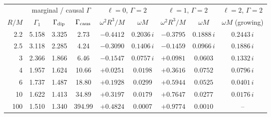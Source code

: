 \begin{tabular}{rccc|cc|cc|c}\toprule
 & \multicolumn{3}{c|}{marginal / causal $\Gamma$} & \multicolumn{2}{c|}{$\ell=0$, $\Gamma=2$} & \multicolumn{2}{c|}{$\ell=1$, $\Gamma=2$} & $\ell=2$, $\Gamma=2$\\
$R/M$ & $\Gamma_1$ & $\Gamma_{\rm dip}$ & $\Gamma_{\rm caus}$ & $\omega^2R^3/M$ & $\omega M$ & $\omega^2R^3/M$ & $\omega M$ & $\omega M$ (growing)\\\midrule
2.2 & 5.158 & 3.325 & 2.73 & $-0.4412$ & $0.2036\,i$ & $-0.3795$ & $0.1888\,i$ & $0.2443\,i$ \\
2.5 & 3.118 & 2.285 & 4.24 & $-0.3090$ & $0.1406\,i$ & $-0.1459$ & $0.0966\,i$ & $0.1886\,i$ \\
3 & 2.366 & 1.866 & 6.46 & $-0.1547$ & $0.0757\,i$ & $+0.0981$ & $0.0603$ & $0.1332\,i$ \\
4 & 1.957 & 1.624 & 10.66 & $+0.0251$ & $0.0198$ & $+0.3616$ & $0.0752$ & $0.0796\,i$ \\
6 & 1.737 & 1.487 & 18.80 & $+0.1928$ & $0.0299$ & $+0.5944$ & $0.0525$ & $0.0401\,i$ \\
10 & 1.622 & 1.413 & 34.89 & $+0.3197$ & $0.0179$ & $+0.7647$ & $0.0277$ & $0.0176\,i$ \\
100 & 1.510 & 1.340 & 394.99 & $+0.4824$ & $0.0007$ & $+0.9774$ & $0.0010$ & -- \\
\bottomrule\end{tabular}
